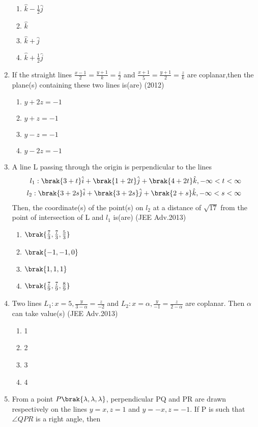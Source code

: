 \begin{enumerate}
  \begin{enumerate}
	  \item $\hat{k}-\frac{1}{2}\hat{j}$
	  \item $\hat{k}$
	  \item $\hat{k}+\hat{j}$
	  \item $\hat{k}+\frac{1}{2}\hat{j}$
   \end{enumerate}
	\item If the straight lines $\frac{x-1}{2}=\frac{y+1}{k}=\frac{z}{2}$ and $\frac{x+1}{5}=\frac{y+1}{2}=\frac{z}{k}$ are coplanar,then the plane(s) containing these two lines is(are) \hfill{(2012)}
		\begin{enumerate}
			\item $y+2z=-1$
			\item $y+z=-1$
			\item $y-z=-1$
			\item $y-2z=-1$
		\end{enumerate}
	\item A line L passing through the origin is perpendicular to the lines
		\begin{align*}
			l_1 : \brak{3+t}\hat{i}+\brak{1+2t}\hat{j}+\brak{4+2t}\hat{k}, -\infty<t<\infty \\
			l_2 : \brak{3+2s}\hat{i}+\brak{3+2s}\hat{j}+\brak{2+s}\hat{k},-\infty<s<\infty 
		\end{align*}
		Then, the coordinate(s) of the point(s) on $l_2$ at a distance of $\sqrt{17}$ from the point of intersection of L and $l_1$ is(are) \hfill{(JEE Adv.2013)}
		\begin{enumerate}
			\item $\brak{\frac{7}{3},\frac{7}{3},\frac{5}{3}}$
			\item $\brak{-1,-1,0}$
			\item $\brak{1,1,1}$
			\item $\brak{\frac{7}{9},\frac{7}{9},\frac{8}{9}}$
		\end{enumerate}
	\item Two lines $L_1: x=5,\frac{y}{3-\alpha}=\frac{z}{-2}$ and $L_2: x=\alpha,\frac{y}{-1}=\frac{z}{2-\alpha}$ are coplanar. Then $\alpha$ can take value(s) \hfill{(JEE Adv.2013)}
		\begin{enumerate}
			\item 1
			\item 2 
			\item 3
			\item 4
		\end{enumerate}
	\item From a point $P\brak{\lambda,\lambda,\lambda}$, perpendicular PQ and PR are drawn respectively on the lines $y=x,z=1$ and $y=-x,z=-1$. If P is such that $\angle QPR$ is a right angle, then

\end{enumerate}
